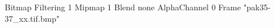 {Bitmap
	{Filtering 1}
	{Mipmap 1}
	{Blend none}
	{AlphaChannel 0}
	{Frame "pak35-37_xx.tif.bmp"}
}
